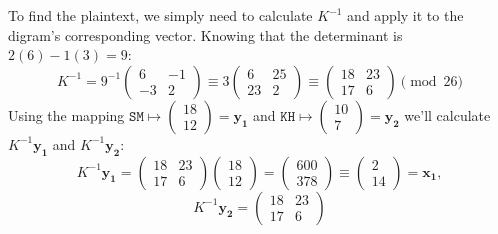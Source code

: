 \documentclass[12pt]{article}
\newenvironment{answer}
    {\begin{adjustwidth}{0pt}{0pt}}
    {\end{adjustwidth}}
\theoremstyle{remark}  %
\begin{document}
    \begin{answer}
        To find the plaintext, we simply need to calculate $K^{-1}$ and apply it to the digram's corresponding vector. Knowing that the determinant is $2(6)-1(3)=9$: $$
            K^{-1} = 9^{-1}\begin{pmatrix}
                6 & -1 \\
                -3 & 2
            \end{pmatrix} \equiv 3 \begin{pmatrix}
                6 & 25 \\
                23 & 2
            \end{pmatrix} \equiv
            \begin{pmatrix}
                18 & 23 \\
                17 & 6
            \end{pmatrix} \pmod{26}
        $$ Using the mapping $\texttt{SM}\mapsto \begin{pmatrix}
            18 \\
            12
        \end{pmatrix}=\mathbf{y_1}$ and $\texttt{KH}\mapsto \begin{pmatrix}
            10 \\
            7
        \end{pmatrix}=\mathbf{y_2}$ we'll calculate $K^{-1}\mathbf{y_1}$ and $K^{-1}\mathbf{y_2}$: $$
            K^{-1}\mathbf{y_1} = \begin{pmatrix}
                18 & 23 \\
                17 & 6
            \end{pmatrix}
            \begin{pmatrix}
                18 \\
                12
            \end{pmatrix} = 
            \begin{pmatrix}
                600 \\
                378
            \end{pmatrix} \equiv
            \begin{pmatrix}
                2 \\
                14
            \end{pmatrix} = \mathbf{x_1}, $$$$ K^{-1}\mathbf{y_2} = 
            \begin{pmatrix}
                18 & 23 \\
                17 & 6
            \end{pmatrix}
$$
\end{answer}
\end{document}

